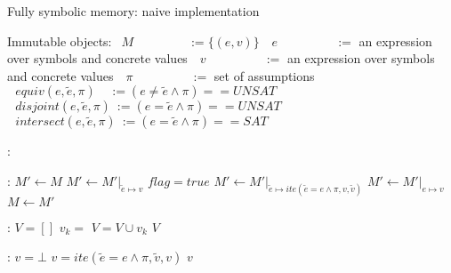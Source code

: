 \documentclass{article}
\begin{document}
\begin{algorithm}
  \normalsize

  \caption{Fully symbolic memory: naive implementation}
  \begin{algorithmic}
  	\State Immutable objects:
  	\State $~~M~~~~~~~~~~~~~~~~~~~\,:= \{(e,v)\}$ 
  	\State $~~~e~~~~~~~~~~~~~~~~~~~\,~:=$ an expression over symbols and concrete values
  	\State $~~~v~~~~~~~~~~~~~~~~~~~~\,:=$ an expression over symbols and concrete values
  	\State $~~~\pi~~~~~~~~~~~~~~~~~~~~\,:=$ set of assumptions
  	\State $~~~equiv(e, \widetilde{e}, \pi)~~~~\,:= (e \not = \widetilde{e} \wedge \pi) == UNSAT$ 
  	\State $~~~disjoint(e, \widetilde{e}, \pi)~:=  (e = \widetilde{e} \wedge \pi) == UNSAT$ 
  	\State $~~~intersect(e, \widetilde{e}, \pi)~:=  (e = \widetilde{e} \wedge \pi) == SAT$ 

  \end{algorithmic}

  \bigskip
  
  \begin{algorithmic}[1]
	:
			\State {}
		\EndFor
	\EndFunction
  \end{algorithmic}


  \bigskip

  \begin{algorithmic}[1]
	:
		\State $M'  \leftarrow M$
	    		\State $M' \leftarrow M'\vert_{\widetilde{e} \mapsto v}$
	    		\State $flag = true$
	    	\Else
	    		\State $M' \leftarrow M'\vert_{\widetilde{e} \mapsto ite(\widetilde{e} = e \wedge \pi, v, \widetilde{v})}$
	    	\EndIf
	    \EndFor
	    	\State $M' \leftarrow M'\vert_{e \mapsto v}$
	    \EndIf
	    \State $M  \leftarrow M'$
	\EndFunction
  \end{algorithmic}
  
  \bigskip

  \begin{algorithmic}[1]
	:
		\State $V = []$ 
			\State $v_k = $ 
			\State $V = V \cup v_k$
		\EndFor
		\State \Return $V$
	\EndFunction
  \end{algorithmic}

  \bigskip

  \begin{algorithmic}[1]
	:
		\State $v = \bot$ 
				\State $v = ite(\widetilde{e} = e \wedge \pi, \widetilde{v}, v)$
			\EndIf
		\EndFor
		\State \Return $v$
	\EndFunction
  \end{algorithmic}
  \bigskip
  
\end{algorithm}
\end{document}
